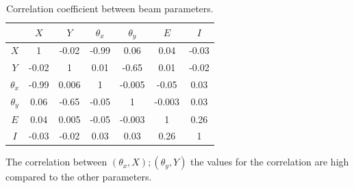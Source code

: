 \begin{table}[!h]
\centering
\begin{tabular}{c|cccccc}
\hline 
             & $X$ & $Y$ & $\theta_{x}$ & $\theta_{y}$ & $E$ & $I$\\ 
\hline 
$X$            & 1 & -0.02 & -0.99 & 0.06 & 0.04  & -0.03\\ 

$Y$            & -0.02 & 1 & 0.01 & -0.65 & 0.01  & -0.02\\ 

$\theta_{x}$ & -0.99 & 0.006 & 1  & -0.005 & -0.05 & 0.03\\ 

$\theta_{y}$ & 0.06 & -0.65 & -0.05 & 1 & -0.003  & 0.03\\ 
 
$E$            & 0.04 & 0.005 & -0.05  & -0.003  & 1 & 0.26\\ 
 
$I$            & -0.03 & -0.02 & 0.03  & 0.03 & 0.26 & 1\\ 
\hline
\end{tabular}
\caption{Correlation coefficient between beam parameters.}
\label{tab:CorrMatrix} 
\end{table}

The correlation between $(\theta_{x},X);(\theta_{y},Y)$ the values for the correlation are high compared to the other parameters. 

